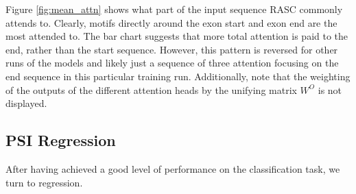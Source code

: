 Figure \ref{fig:mean_attn} shows what part of the input sequence RASC commonly attends to. Clearly, motifs directly around the exon start and exon end are the most attended to. 
The bar chart suggests that more total attention is paid to the end, rather than the start sequence. However, this pattern is reversed for other runs of the models and likely just a sequence of three attention focusing on the end sequence in this particular training run. Additionally, note that the weighting of the outputs of the different attention heads by the unifying matrix $W^O$ is not displayed. 










%


\subsection{PSI Regression} \label{subsubsec:psi_regression}
After having achieved a good level of performance on the classification task, we turn to regression. 


